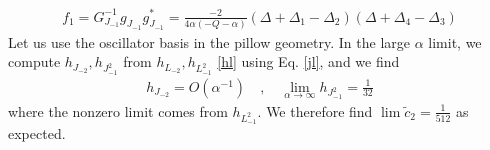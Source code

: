 \documentclass[12pt,a4paper]{article}
\begin{document}
\begin{align}
 f_1 = G_{J_{-1}}^{-1} g_{J_{-1}} g_{J_{-1}}^* = \frac{-2}{4\alpha(-Q-\alpha)}(\Delta+\Delta_1-\Delta_2)(\Delta+\Delta_4-\Delta_3)
\end{align}
Let us use the oscillator basis in the pillow geometry. In the large $\alpha$ limit, we compute $h_{J_{-2}},h_{J_{-1}^2}$ from $h_{L_{-2}},h_{L_{-1}^2}$ \eqref{hl} using Eq. \eqref{jl}, and we find 
\begin{align}
 h_{J_{-2}} = O(\alpha^{-1}) \quad , \quad \lim_{\alpha\to \infty} h_{J_{-1}^2} = \frac{1}{32}
\end{align}
where the nonzero limit comes from $h_{L_{-1}^2}$. We therefore find $\lim \tilde{c}_2 = \frac{1}{512}$ as expected. 




\end{document}
